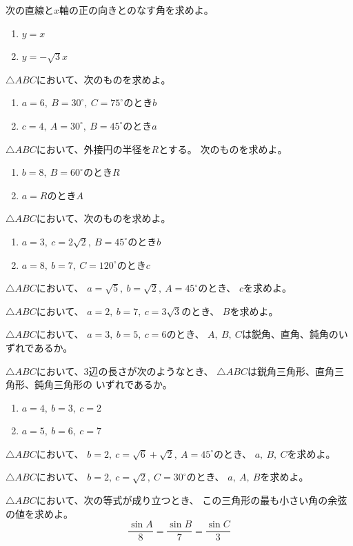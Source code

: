\documentclass[a4paper, 10pt]{jarticle}
\begin{document}
次の直線と$x$軸の正の向きとのなす角を求めよ。
\begin{enumerate}
  \item $y=x$
  \item $y=-\sqrt{3}x$
\end{enumerate}

$\triangle ABC$において、次のものを求めよ。
\begin{enumerate}
  \item $a=6,\ B=30^\circ,\ C=75^\circ$のとき$b$
  \item $c=4,\ A=30^\circ,\ B=45^\circ$のとき$a$
\end{enumerate}

$\triangle ABC$において、外接円の半径を$R$とする。
次のものを求めよ。
\begin{enumerate}
  \item $b=8,\ B=60^\circ$のとき$R$
  \item $a=R$のとき$A$
\end{enumerate}

$\triangle ABC$において、次のものを求めよ。
\begin{enumerate}
  \item $a=3,\ c=2\sqrt{2},\ B=45^\circ$のとき$b$
  \item $a=8,\ b=7,\ C=120^\circ$のとき$c$
\end{enumerate}

$\triangle ABC$において、
$a=\sqrt{5},\ b=\sqrt{2},\ A=45^\circ$のとき、
$c$を求めよ。

$\triangle ABC$において、
$a=2,\ b=7,\ c=3\sqrt{3}$のとき、
$B$を求めよ。

$\triangle ABC$において、
$a=3,\ b=5,\ c=6$のとき、
$A,\ B,\ C$は鋭角、直角、鈍角のいずれであるか。

$\triangle ABC$において、3辺の長さが次のようなとき、
$\triangle ABC$は鋭角三角形、直角三角形、鈍角三角形の
いずれであるか。
\begin{enumerate}
  \item $a=4,\ b=3,\ c=2$
  \item $a=5,\ b=6,\ c=7$
\end{enumerate}

$\triangle ABC$において、
$b=2,\ c=\sqrt{6}+\sqrt{2},\ A=45^\circ$のとき、
$a,\ B,\ C$を求めよ。

$\triangle ABC$において、
$b=2,\ c=\sqrt{2},\ C=30^\circ$のとき、
$a,\ A,\ B$を求めよ。

$\triangle ABC$において、次の等式が成り立つとき、
この三角形の最も小さい角の余弦の値を求めよ。
\[
\frac{\sin A}{8}=\frac{\sin B}{7}=\frac{\sin C}{3}
\]
\end{document}
